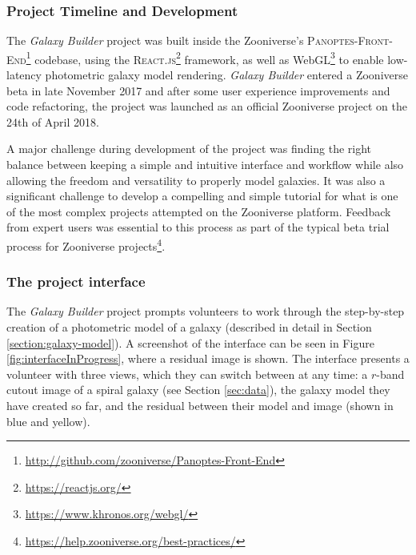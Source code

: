 \documentclass[trackchanges]{aastex63}
\begin{document}
\subsubsection{Project Timeline and Development}

The \textit{Galaxy Builder} project was built inside the Zooniverse's \citep{Simpson:2014:ZOW:2567948.2579215} \textsc{Panoptes-Front-End}\footnote{\url{http://github.com/zooniverse/Panoptes-Front-End}} codebase, using the \textsc{React.js}\footnote{\url{https://reactjs.org/}} framework, as well as WebGL\footnote{\url{https://www.khronos.org/webgl/}} to enable low-latency photometric galaxy model rendering. \textit{Galaxy Builder} entered a Zooniverse beta in late November 2017 and after some user experience improvements and code refactoring, the project was launched as an official Zooniverse project on the 24th of April 2018.

A major challenge during development of the project was finding the right balance between keeping a simple and intuitive interface and workflow while also allowing the freedom and versatility to properly model galaxies. It was also a significant challenge to develop a compelling and simple tutorial for what is one of the most complex projects attempted on the Zooniverse platform. Feedback from expert users was essential to this process as part of the typical beta trial process for Zooniverse projects\footnote{\url{https://help.zooniverse.org/best-practices/}}.


\subsubsection{The project interface}

The \textit{Galaxy Builder} project prompts volunteers to work through the step-by-step creation of a photometric model of a galaxy (described in detail in Section \ref{section:galaxy-model}). A screenshot of the interface can be seen in Figure \ref{fig:interfaceInProgress}, where a residual image is shown. The interface presents a volunteer with three views, which they can switch between at any time: a $r$-band cutout image of a spiral galaxy (see Section \ref{sec:data}), the galaxy model they have created so far, and the residual between their model and image (shown in blue and yellow).
\end{document}
